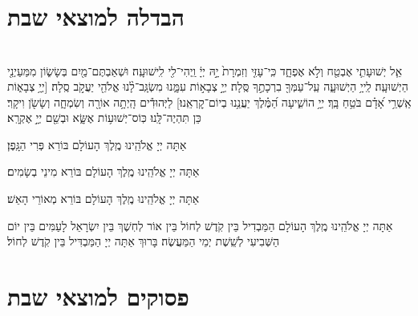 \vfill

\\
\\

\aleinu

\ledavid

\mournerskaddish

\vfill


 \\

\section[הבדלה]{ הבדלה למוצאי שבת } \label{havdala}

\\
אֵ֧ל יְשׁוּעָתִ֛י אֶבְטַ֖ח וְלֹ֣א אֶפְחָ֑ד כִּֽי־עָזִּ֤י וְזִמְרָת֙ יָ֣הּ יְיָ֔ וַֽיְהִי־לִ֖י לִֽישׁוּעָֽה׃
וּשְׁאַבְתֶּם־מַ֖יִם בְּשָׂשׂ֑וֹן מִמַּעַיְנֵ֖י הַיְשׁוּעָֽה׃
לַֽייָ֥ הַיְשׁוּעָ֑ה עַֽל־עַמְּךָ֖ בִרְכָתֶ֣ךָ סֶּֽלָה׃
יְיָ֣ צְבָא֣וֹת עִמָּ֑נוּ מִשְׂגָּֽב־לָ֨נוּ אֱלֹהֵ֖י יַעֲקֹ֣ב סֶֽלָה׃
[יְיָ֥ צְבָא֑וֹת אַֽשְׁרֵ֥י אָ֝דָ֗ם בֹּטֵ֥חַ בָּֽךְ׃
יְיָ֥ הוֹשִׁ֑יעָה הַ֝מֶּ֗לֶךְ יַעֲנֵ֥נוּ בְיוֹם־קׇרְאֵֽנוּ׃]
לַיְּהוּדִ֕ים הָֽיְתָ֥ה אוֹרָ֖ה וְשִׂמְחָ֑ה וְשָׂשֹׂ֖ן וִיקָֽר׃ כֵּן תִּהְיֶה־לָּֽנוּ׃ כּֽוֹס־יְשׁוּע֥וֹת אֶשָּׂ֑א וּבְשֵׁ֖ם יְיָ֣ אֶקְרָֽא׃

\savri
{}
אַתָּה יְיָ אֱלֹהֵֽינוּ מֶֽלֶךְ הָעוֹלָם בּוֹרֵא פְּרִי הַגָּֽפֶן׃

אַתָּה יְיָ אֱלֹהֵֽינוּ מֶֽלֶךְ הָעוֹלָם בּוֹרֵא מִינֵי בְשָׂמִים׃

אַתָּה יְיָ אֱלֹהֵֽינוּ מֶֽלֶךְ הָעוֹלָם בּוֹרֵא מְאוֹרֵי הָאֵשׁ׃

אַתָּה יְיָ אֱלֹהֵֽינוּ מֶֽלֶךְ הָעוֹלָם הַמַּבְדִיל בֵּין קֹֽדֶשׁ לְחוֹל בֵּין אוֹר לְחֽשֶׁךְ בֵּין יִשְׂרָאֵל לָעַמִּים בֵּין יוֹם הַשְּׁבִיעִי לְשֵֽׁשֶׁת יְמֵי הַמַּעֲשֶׂה׃ בָּרוּךְ אַתָּה יְיָ הַמַּבְדִּיל בֵּין קֹֽדֶשׁ לְחוֹל׃

\section[פסוקים למוצ״ש]{ פסוקים למוצאי שבת }

